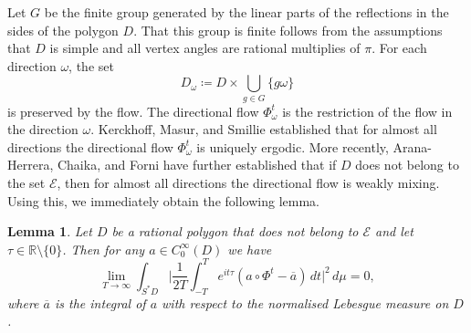 \documentclass[11pt,twoside,reqno]{amsart}
\newcommand{\R}{\mathbb{R}}
\newcommand{\1}{\mathrm{\mathbf{1}}}
\numberwithin{equation}{section}
\theoremstyle{plain}
\newtheorem{lemma}[thm]{Lemma}
\theoremstyle{definition}
\theoremstyle{remark}
\begin{document}
Let $G$ be the finite group generated by the linear parts of the reflections in the sides of the polygon $D$. That this group is finite follows from the assumptions that $D$ is simple and all vertex angles are rational multiplies of $\pi$. For each direction $\omega$, the set
\begin{equation*}
    D_\omega \coloneqq D\times \bigcup_{g\in G} \{g\omega\} 
\end{equation*}
is preserved by the flow. The directional flow $\Phi^t_{\omega}$ is the restriction of the flow in the direction $\omega$. Kerckhoff, Masur, and Smillie \cite{MR855297} established that for almost all directions the directional flow $\Phi^t_{\omega}$ is uniquely ergodic. More recently, Arana-Herrera, Chaika, and Forni \cite{aranaherrera2024weakmixingrationalbilliards} have further established that if $D$ does not belong to the set $\mathcal{E}$, then for almost all directions the directional flow is weakly mixing. Using this, we immediately obtain the following lemma.
%
\begin{lemma}\label{LE:consequence_weak_mixing}
    Let $D$ be a rational polygon that does not belong to $\mathcal{E}$ and let $\tau\in\R\setminus\{0\}$. Then for any $a\in C_0^\infty(D)$ we have
    \begin{equation*}
        \lim_{T\rightarrow \infty} \int_{S^*D} \bigg| \frac{1}{2T} \int_{-T}^{T} e^{it\tau} (  a\circ\Phi^t - \overline{a}) \, dt \bigg|^2 \, d\mu = 0,
    \end{equation*}
    where $\overline{a}$ is the integral of $a$ with respect to the normalised Lebesgue measure on $D$.
\end{lemma}
\end{document}
